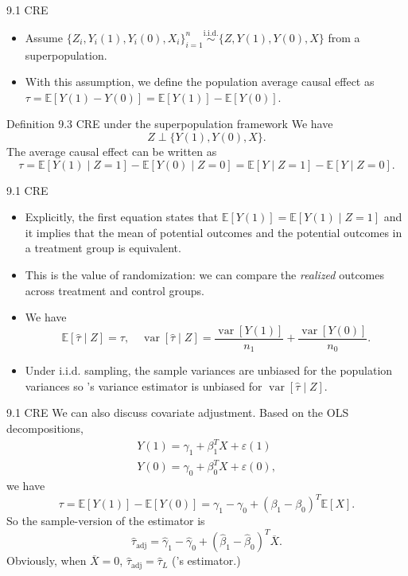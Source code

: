 \documentclass[aspectratio=169, 12pt]{beamer}
\begin{document}
\begin{frame}{9.1 CRE}
  \begin{itemize}
    \item Assume $\{Z_i,Y_i(1),Y_i(0),X_i\}_{i=1}^n\overset{\text{i.i.d.}}{\sim}\{Z,Y(1),Y(0),X\}$ from a superpopulation.
    \item With this assumption, we define the population average causal effect as $\tau=\mathbb{E}[Y(1)-Y(0)]=\mathbb{E}[Y(1)]-\mathbb{E}[Y(0)].$
  \end{itemize}
  \begin{keybox}{Definition 9.3 CRE under the superpopulation framework}
    We have
    \[
    Z\perp \{Y(1),Y(0),X\}.
    \]
    The average causal effect can be written as
    \[
    \tau = \mathbb{E}[Y(1)\mid Z=1]-\mathbb{E}[Y(0)\mid Z=0] = \mathbb{E}[Y\mid Z=1]-\mathbb{E}[Y\mid Z=0].
    \]
  \end{keybox}
\end{frame}

\begin{frame}{9.1 CRE}
  \begin{itemize}
    \item Explicitly, the first equation states that $\mathbb{E}[Y(1)]=\mathbb{E}[Y(1)\mid Z=1]$ and it implies that the mean of potential outcomes and the potential outcomes in a treatment group is equivalent. 
    \item This is the value of randomization: we can compare the \textit{realized} outcomes across treatment and control groups.
    \item We have
    \[
    \mathbb{E}[\hat{\tau}\mid Z]=\tau, \quad \operatorname{var}[\hat{\tau}\mid Z]=\frac{\operatorname{var}[Y(1)]}{n_1}+\frac{\operatorname{var}[Y(0)]}{n_0}.
    \]
    \item Under i.i.d. sampling, the sample variances are unbiased for the population variances so \citet{neyman1923application}'s variance estimator is unbiased for $\operatorname{var}[\hat{\tau}\mid Z]$.
  \end{itemize}
\end{frame}

\begin{frame}{9.1 CRE}
  We can also discuss covariate adjustment. Based on the OLS decompositions, 
  \begin{gather*}
    Y(1)=\gamma_1+\beta_1^TX+\varepsilon(1)\\
    Y(0)=\gamma_0+\beta_0^TX+\varepsilon(0),
  \end{gather*}
  we have 
  \[
  \tau=\mathbb{E}[Y(1)]-\mathbb{E}[Y(0)]=\gamma_1-\gamma_0+(\beta_1-\beta_0)^T\mathbb{E}[X].
  \]
  So the sample-version of the estimator is
  \[
  \hat{\tau}_{\text{adj}}=\hat{\gamma}_1-\hat{\gamma}_0+(\hat{\beta}_1-\hat{\beta}_0)^T\overline{X}.
  \]
  Obviously, when $\overline{X}=0$, $\hat{\tau}_{\text{adj}}=\hat{\tau}_L$ (\citet{lin2013agnostic}'s estimator.)
\end{frame}
\end{document}
